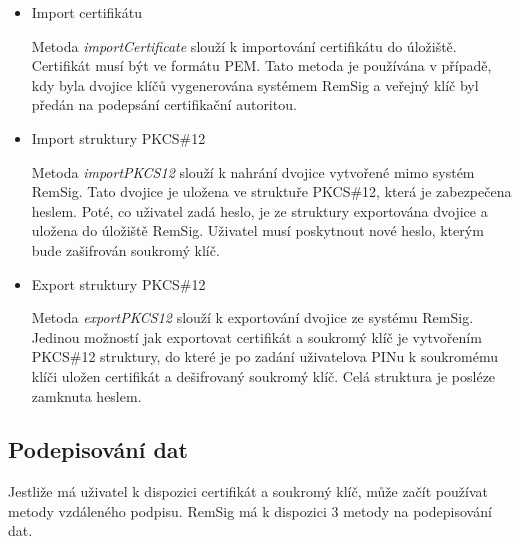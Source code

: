 \documentclass[]{fithesis3}
\begin{document}
	\begin{itemize}
	\item Import certifikátu 

		Metoda \textit{importCertificate} slouží k importování certifikátu do úložiště. Certifikát 			musí být ve formátu PEM. Tato metoda je používána v případě, kdy byla dvojice klíčů 				vygenerována systémem RemSig a veřejný klíč byl předán na podepsání certifikační 				autoritou.

	\item Import struktury PKCS\#12

		Metoda \textit{importPKCS12} slouží k nahrání dvojice vytvořené mimo systém RemSig. 			Tato dvojice je uložena ve struktuře PKCS\#12, která je zabezpečena heslem. Poté, co 			uživatel zadá heslo, je ze struktury exportována dvojice a uložena do úložiště RemSig. 				Uživatel musí poskytnout nové heslo, kterým bude zašifrován soukromý klíč.

	\item Export struktury PKCS\#12

		Metoda \textit{exportPKCS12} slouží k exportování dvojice ze systému RemSig. Jedinou 			možností jak exportovat certifikát a soukromý klíč je vytvořením PKCS\#12 struktury, do 		které je po zadání uživatelova PINu k soukromému klíči uložen certifikát a dešifrovaný 				soukromý klíč. Celá struktura je posléze zamknuta heslem.
	\end{itemize}

	\subsection{Podepisování dat}

	Jestliže má uživatel k dispozici certifikát a soukromý klíč, může začít používat metody 				vzdáleného podpisu. RemSig má k dispozici 3 metody na podepisování dat.
\end{document}
